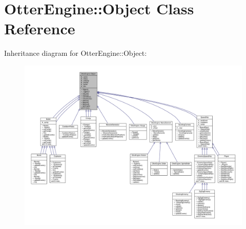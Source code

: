 \hypertarget{class_otter_engine_1_1_object}{}\section{Otter\+Engine\+:\+:Object Class Reference}
\label{class_otter_engine_1_1_object}


Inheritance diagram for Otter\+Engine\+:\+:Object\+:\nopagebreak
\begin{figure}[H]
\begin{center}
\leavevmode
\includegraphics[width=350pt]{da/d89/class_otter_engine_1_1_object__inherit__graph}
\end{center}
\end{figure}


